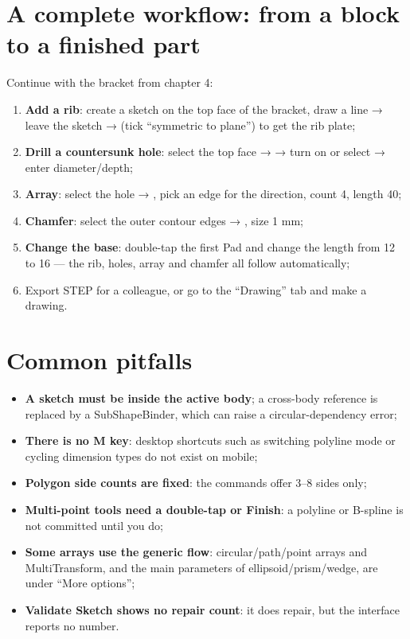 \section{A complete workflow: from a block to a finished part}

Continue with the bracket from chapter 4:

\begin{enumerate}
  \item \textbf{Add a rib}: create a sketch on the top face of the bracket, draw a line → leave the sketch → 
        (tick ``symmetric to plane'') to get the rib plate;
  \item \textbf{Drill a countersunk hole}: select the top face →  → turn on  or select
         → enter diameter/depth;
  \item \textbf{Array}: select the hole → , pick an edge for the direction, count 4, length 40;
  \item \textbf{Chamfer}: select the outer contour edges → , size 1 mm;
  \item \textbf{Change the base}: double-tap the first Pad and change the length from 12 to 16 --- the rib, holes, array
        and chamfer all follow automatically;
  \item Export STEP for a colleague, or go to the ``Drawing'' tab and make a drawing.
\end{enumerate}


\section{Common pitfalls}

\begin{itemize}
  \item \textbf{A sketch must be inside the active body}; a cross-body reference is replaced by a SubShapeBinder, which
        can raise a circular-dependency error;
  \item \textbf{There is no M key}: desktop shortcuts such as switching polyline mode or cycling dimension types do not
        exist on mobile;
  \item \textbf{Polygon side counts are fixed}: the commands offer 3--8 sides only;
  \item \textbf{Multi-point tools need a double-tap or Finish}: a polyline or B-spline is not committed until you do;
  \item \textbf{Some arrays use the generic flow}: circular/path/point arrays and MultiTransform, and the main parameters
        of ellipsoid/prism/wedge, are under ``More options'';
  \item \textbf{Validate Sketch shows no repair count}: it does repair, but the interface reports no number.
\end{itemize}
